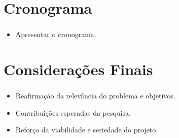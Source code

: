 \documentclass[aspectratio=169]{beamer}
\begin{document}
\section{Cronograma}

\begin{frame}[fragile]
	\frametitle{\secname}
	\begin{itemize}
		\item Apresentar o cronograma.
	\end{itemize}
\end{frame}

\section{Considerações Finais}

\begin{frame}[fragile]
	\frametitle{\secname}
	\begin{itemize}
		\item Reafirmação da relevância do problema e objetivos.
		\item Contribuições esperadas da pesquisa.
		\item Reforço da viabilidade e seriedade do projeto.
	\end{itemize}
\end{frame}
\end{document}
